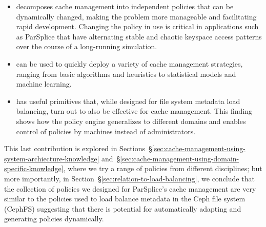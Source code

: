 \begin{itemize}

  \item decomposes cache management into independent policies that can be
  dynamically changed, making the problem more manageable and facilitating rapid
  development. Changing the policy in use is critical in applications such as
  ParSplice that have alternating stable and chaotic keyspace access patterns
  over the course of a long-running simulation.  

  \item can be used to quickly deploy a variety of cache management strategies,
  ranging from basic algorithms and heuristics to statistical models and machine
  learning.

  \item has useful primitives that, while designed for file system metadata
  load balancing, turn out to also be effective for cache management. This
  finding shows how the policy engine generalizes to different domains and
  enables control of policies by machines instead of administrators.

\end{itemize}


This last contribution is explored in
Sections~\S\ref{sec:cache-management-using-system-archiecture-knowledge}
and~\S\ref{sec:cache-management-using-domain-specific-knowledge}, where we try
a range of policies from different disciplines; but more importantly, in
Section~\S\ref{sec:relation-to-load-balancing}, we conclude that the collection
of policies we designed for ParSplice's cache management are very similar to
the policies used to load balance metadata in the Ceph file system (CephFS)
suggesting that there is potential for automatically adapting and generating
policies dynamically. 


